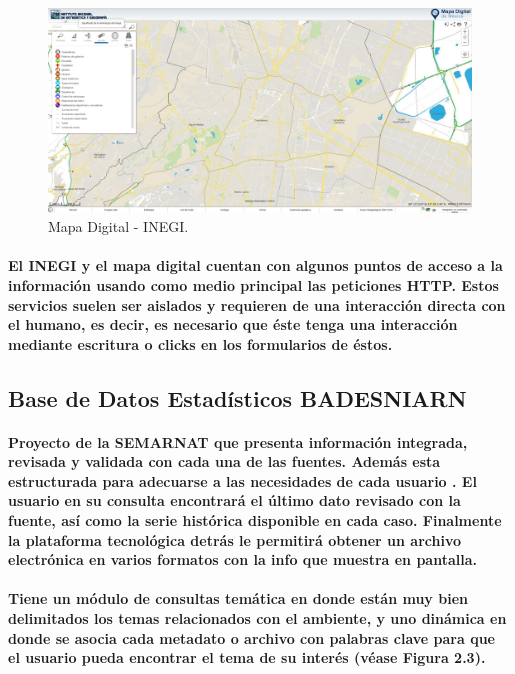   \begin{figure}[h!]
      \centering
        \includegraphics[width=\textwidth]{./images/MapaDigital.png}
      \caption{Mapa Digital - INEGI.}
  \end{figure}

  \paragraph{El INEGI y el mapa digital cuentan con algunos puntos de acceso a la información usando como medio principal las peticiones HTTP. Estos servicios suelen ser aislados y requieren de una interacción directa con el humano, es decir, es necesario que éste tenga una interacción mediante escritura o clicks en los formularios de éstos.}

  \subsection {Base de Datos Estadísticos BADESNIARN}
    \paragraph {Proyecto de la SEMARNAT que presenta información integrada, revisada y validada con cada una de las fuentes. Además esta estructurada para adecuarse a las necesidades de cada usuario . El usuario en su consulta encontrará el último dato revisado con la fuente, así como la serie histórica disponible en cada caso. Finalmente la plataforma tecnológica detrás le permitirá obtener un archivo electrónica en varios formatos con la info que muestra en pantalla.}    

    \paragraph { Tiene un módulo de consultas temática en donde están muy bien delimitados los temas relacionados con el ambiente, y uno dinámica en donde se asocia cada metadato o archivo con palabras clave para que el usuario pueda encontrar el tema de su interés (véase Figura 2.3). \cite{17}}

